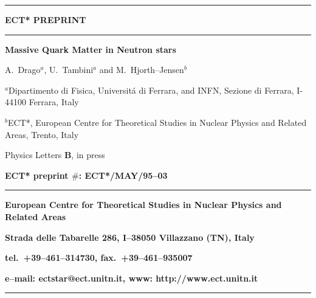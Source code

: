 


\thispagestyle{empty}
\newcommand{\HRule}{\rule{\linewidth}{1mm}}
\setlength{\parindent}{0mm}
\setlength{\parskip}{0mm}


   \HRule
     \begin{center}
         \Huge {\bf ECT* PREPRINT}
     \end{center}
   \HRule

   \begin{center}
      \Large {\bf  Massive Quark Matter in Neutron stars}
   \end{center}
   \begin{center}
      \large A.\ Drago$^a$, U.\ Tambini$^a$ and
      M.\ Hjorth--Jensen$^b$
    \end{center}
    \begin{center}
     \large $^a$Dipartimento di Fisica, Universit\'{a} di Ferrara, and INFN,
    Sezione di Ferrara, I-44100 Ferrara, Italy 
    \end{center}
    \begin{center}
      \large   $^b$ECT*, European Centre for Theoretical
        Studies in Nuclear Physics and Related Areas,
        Trento, Italy
    \end{center}

    \begin{center}
      \large   Physics Letters {\bf B}, in press
    \end{center}
    \begin{center}
        \Large {\bf ECT* preprint $\#$: ECT*/MAY/95--03}
    \end{center}
    \begin{figure}[hbtp]
        \begin{center}
        {\centering\mbox{}}
        \end{center}
     \end{figure}
    \HRule
    \begin{center}
        \Large {\bf European Centre for Theoretical Studies in Nuclear
        Physics and Related Areas}
    \end{center}
    \begin{center}
        {\bf Strada delle Tabarelle 286, I--38050 Villazzano (TN),
        Italy}
    \end{center}
    \begin{center}
        {\bf tel.\ +39--461--314730, fax.\ +39--461--935007}
    \end{center}
     \begin{center}
        {\bf e--mail: ectstar@ect.unitn.it, www: http://www.ect.unitn.it}
    \end{center}
    \HRule

